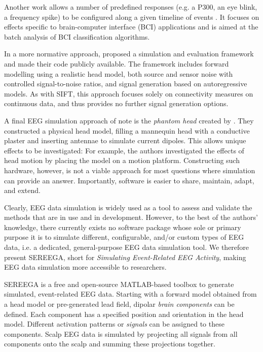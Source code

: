 Another work allows a number of predefined responses (e.g. a P300, an eye blink, a frequency spike) to be configured along a given timeline of events \cite{lindgren2018simbci}. It focuses on effects specific to brain-computer interface (BCI) applications and is aimed at the batch analysis of BCI classification algorithms.

In a more normative approach,  proposed a simulation and evaluation framework and made their code publicly available. The framework includes forward modelling using a realistic head model, both source and sensor noise with controlled signal-to-noise ratios, and signal generation based on autoregressive models. As with SIFT, this approach focuses solely on connectivity measures on continuous data, and thus provides no further signal generation options.

A final EEG simulation approach of note is the \emph{phantom head} created by . They constructed a physical head model, filling a mannequin head with a conductive plaster and inserting antennae to simulate current dipoles. This allows unique effects to be investigated: For example, the authors investigated the effects of head motion by placing the model on a motion platform. Constructing such hardware, however, is not a viable approach for most questions where simulation can provide an answer. Importantly, software is easier to share, maintain, adapt, and extend.

Clearly, EEG data simulation is widely used as a tool to assess and validate the methods that are in use and in development. However, to the best of the authors' knowledge, there currently exists no software package whose sole or primary purpose it is to simulate different, configurable, and/or custom types of EEG data, i.e. a dedicated, general-purpose EEG data simulation tool. We therefore present SEREEGA, short for \emph{Simulating Event-Related EEG Activity}, making EEG data simulation more accessible to researchers.

SEREEGA is a free and open-source MATLAB-based toolbox to generate simulated, event-related EEG data. Starting with a forward model obtained from a head model or pre-generated lead field, dipolar \emph{brain components} can be defined. Each component has a specified position and orientation in the head model. Different activation patterns or \emph{signals} can be assigned to these components. Scalp EEG data is simulated by projecting all signals from all components onto the scalp and summing these projections together.

